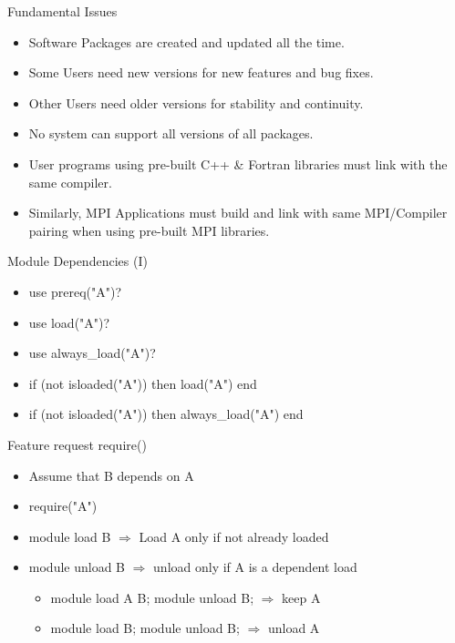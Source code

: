 \documentclass{beamer}
\begin{document}
\begin{frame}{Fundamental Issues}
  \begin{itemize}
    \item Software Packages are created and updated all the time.
    \item Some Users need new versions for new features and bug fixes.
    \item Other Users need older versions for stability and continuity.
    \item No system can support all versions of all packages.
    \item User programs using pre-built C++ \& Fortran libraries must link with the same compiler.
    \item Similarly, MPI Applications must build and link with same
      MPI/Compiler pairing when using pre-built MPI libraries.
  \end{itemize}
\end{frame}


\begin{frame}{Module Dependencies (I)}
  \begin{itemize}
    \item use prereq("A")?
    \item use load("A")?
    \item use always\_load("A")?
    \item if (not isloaded("A")) then load("A")        end
    \item if (not isloaded("A")) then always\_load("A") end
  \end{itemize}
\end{frame}

\begin{frame}{Feature request require()}
  \begin{itemize}
    \item Assume that B depends on A
    \item require("A")
    \item module load B $\Rightarrow$ Load A only if not already
      loaded
    \item module unload B $\Rightarrow$  unload only if A is a
      dependent load
      \begin{itemize}
        \item module load A B; module unload B; $\Rightarrow$ keep A
        \item module load B; module unload B; $\Rightarrow$ unload A
      \end{itemize}
  \end{itemize}
\end{frame}
\end{document}
